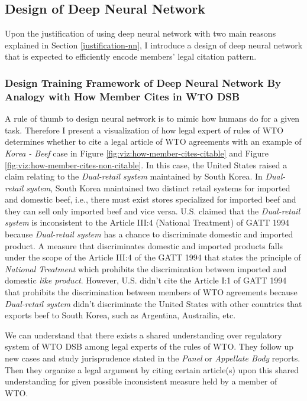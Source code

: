 \documentclass[12pt,letterpaper]{article}
\begin{document}
\subsection{Design of Deep Neural Network}
Upon the justification of using deep neural network with two main reasons explained in Section \ref{justification-nn}, %
I introduce a design of deep neural network that is expected to efficiently encode members' legal citation pattern.

\subsubsection{Design Training Framework of Deep Neural Network By Analogy with How Member Cites in WTO DSB}
A rule of thumb to design neural network is to mimic 
how humans do for a given task. 
Therefore I present a visualization of how legal expert of rules of WTO determines whether to cite a legal article of WTO agreements with an example of \textit{Korea - Beef} case in Figure \ref{fig:viz:how-member-cites-citable} and Figure \ref{fig:viz:how-member-cites-non-citable}.
In this case, the United States raised a claim relating to the \textit{Dual-retail system} maintained by South Korea. In \textit{Dual-retail system}, South Korea maintained two distinct retail systems
for imported and domestic beef, i.e., there must exist stores specialized for imported beef and they can sell only imported beef and vice versa. U.S. claimed that the \textit{Dual-retail system} is inconsistent to the Article III:4 (National Treatment) of GATT 1994 
because \textit{Dual-retail system} has a chance to discriminate domestic and imported product. A measure that discriminates domestic and imported products falls under the scope of the Article III:4 of the GATT 1994 that states the principle of \textit{National Treatment} which prohibits the discrimination between imported and domestic \textit{like product}. However, U.S. didn't 
cite the Article I:1 of GATT 1994 that prohibits the discrimination between members of WTO agreements
because \textit{Dual-retail system} didn't discriminate the United States with other countries that exports beef to South Korea, such as Argentina, Austrailia, etc.

We can understand that there exists a shared understanding over regulatory system of WTO DSB among legal experts of the rules of WTO. They follow up new cases and study jurisprudence stated in the \textit{Panel} or  \textit{Appellate Body} reports.
Then they organize a legal argument by citing certain article(s) upon this shared understanding for given possible inconsistent measure held by a member of WTO.
\end{document}
